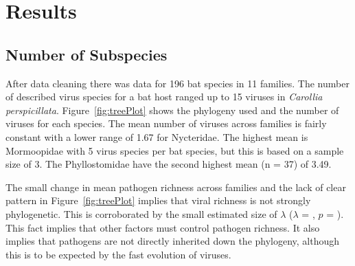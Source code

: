 \clearpage





















\clearpage
\section{Results}


\subsection{Number of Subspecies}

After data cleaning there was data for 196 bat species in 11 families.
The number of described virus species for a bat host ranged up to 15 viruses in \emph{Carollia perspicillata}.
Figure~\ref{fig:treePlot} shows the phylogeny used and the number of viruses for each species.
The mean number of viruses across families is fairly constant with a lower range of 1.67 for Nycteridae.
The highest mean is Mormoopidae with 5 virus species per bat species, but this is based on a sample size of 3.
The Phyllostomidae have the second highest mean (n = 37) of 3.49.

The small change in mean pathogen richness across families and the lack of clear pattern in Figure~\ref{fig:treePlot} implies that viral richness is not strongly phylogenetic. 
This is corroborated by the small estimated size of $\lambda$ ($\lambda$ = , $p$ = ).
This fact implies that other factors must control pathogen richness.
It also implies that pathogens are not directly inherited down the phylogeny, although this is to be expected by the fast evolution of viruses.

